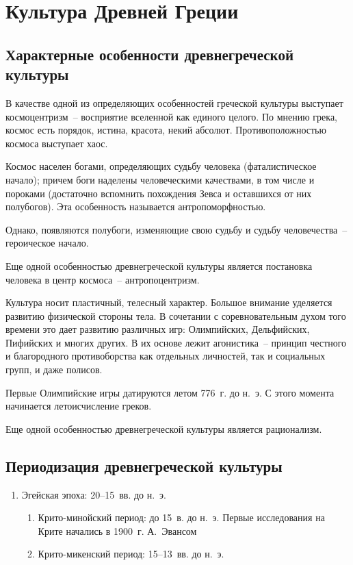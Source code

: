\chapter{Культура Древней Греции}
\section{Характерные особенности древнегреческой культуры}

  В качестве одной из определяющих особенностей греческой культуры выступает
  космоцентризм~-- восприятие вселенной как единого целого. По мнению грека,
  космос есть порядок, истина, красота, некий абсолют. Противоположностью
  космоса выступает хаос.
  
  Космос населен богами, определяющих судьбу человека (фаталистическое начало);
  причем боги наделены человеческими качествами, в том числе и пороками
  (достаточно вспомнить похождения Зевса и оставшихся от них полубогов). Эта
  особенность называется антропоморфностью.
  
  Однако, появляются полубоги, изменяющие свою судьбу и судьбу человечества~--
  героическое начало.
  
  Еще одной особенностью древнегреческой культуры является постановка человека в
  центр космоса~-- антропоцентризм.
  
  \charskip{*}
  
  Культура носит пластичный, телесный характер. Большое внимание уделяется
  развитию физической стороны тела. В сочетании с соревновательным духом того
  времени это дает развитию различных игр: Олимпийских, Дельфийских, Пифийских и
  многих других. В их основе лежит агонистика~-- принцип честного и благородного
  противоборства как отдельных личностей, так и социальных групп, и даже
  полисов.
  
  Первые Олимпийские игры датируются летом 776~г. до н.~э. С этого момента
  начинается летоисчисление греков.
  
  Еще одной особенностью древнегреческой культуры является рационализм.

\section{Периодизация древнегреческой культуры}

  \begin{enumerate}
    \item Эгейская эпоха: 20--15~вв. до н.~э.
      \begin{enumerate}
        \item Крито-минойский период: до 15~в. до н.~э.
          Первые исследования на Крите начались в 1900~г. А.~Эвансом
        \item Крито-микенский период: 15--13~вв. до н.~э.
      \end{enumerate}
  \end{enumerate}

